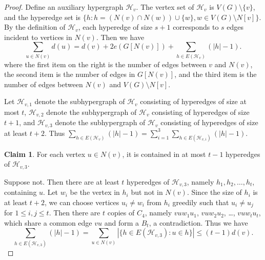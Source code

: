 \documentclass[11pt,a4paper]{article}
\theoremstyle{definition}
\newtheorem{claimthm}{Claim}[section]
\newenvironment{claimproof}
  {\renewcommand{\qedsymbol}{\ensuremath{\blacksquare}}\proof}
  {\endproof}
  {\endproof}
\begin{document}
\begin{proof}
            Define an auxiliary hypergraph $\mathcal{H}_v$.
            The vertex set of $\mathcal{H}_v$ is $V(G) \setminus \{v\}$, and the hyperedge set is $\{h: h = (N(v) \cap N(w)) \cup \{w\}, w \in V(G) \setminus N[v]\}$.
            By the definition of $\mathcal{H}_v$, each hyperedge of size $s + 1$ corresponds to $s$ edges incident to vertices in $N(v)$.
            Then we have
            \begin{equation}\label{eq: sum of dv}
                \sum_{u \in N(v)} d(u) = d(v) + 2e(G[N(v)]) + \sum_{h \in E(\mathcal{H}_v)} (|h| - 1).
            \end{equation}
            where the first item on the right is the number of edges between $v$ and $N(v)$, the second item is the number of edges in $G[N(v)]$, and the third item is the number of edges between $N(v)$ and $V(G) \setminus N[v]$.

            Let $\mathcal{H}_{v, 1}$ denote the subhypergraph of $\mathcal{H}_v$ consisting of hyperedges of size at most $t$, $\mathcal{H}_{v, 2}$ denote the subhypergraph of $\mathcal{H}_v$ consisting of hyperedges of size $t+1$, and $\mathcal{H}_{v, 3}$ denote the subhypergraph of $\mathcal{H}_v$ consisting of hyperedges of size at least $t+2$.
            Thus $\sum_{h \in E(\mathcal{H}_v)} (|h| - 1) = \sum_{i = 1}^{3} \sum_{h \in E(\mathcal{H}_{v, i})} (|h| - 1)$.

            \begin{claimthm}\label{cla: 212}
                For each vertex $u \in N(v)$, it is contained in at most $t-1$ hyperedges of $\mathcal{H}_{v, 3}$.
            \end{claimthm}
            \begin{claimproof}
                Suppose not. Then there are at least $t$ hyperedges of $\mathcal{H}_{v, 3}$, namely $h_1, h_2, \dots, h_t$, containing $u$.
                Let $w_i$ be the vertex in $h_i$ but not in $N(v)$.
                Since the size of $h_i$ is at least $t+2$, we can choose vertices $u_i \neq w_i$ from $h_i$ greedily such that $u_i \neq u_j$ for $1 \leq i, j \leq t$.
                Then there are $t$ copies of $C_4$, namely $v u w_1 u_1$, $v u w_2 u_2$, \dots, $v u w_t u_t$, which share a common edge $vu$ and form a $B_t$, a contradiction.
            \end{claimproof}
            Thus we have 
            \begin{equation}\label{eq: sum of edge size}
                \sum_{h \in E(\mathcal{H}_{v, 3})} (|h| - 1) = \sum_{u \in N(v)} |\{h \in E(\mathcal{H}_{v, 3}): u \in h\}| \leq (t-1) d(v).
            \end{equation}


\end{proof}
\end{document}
